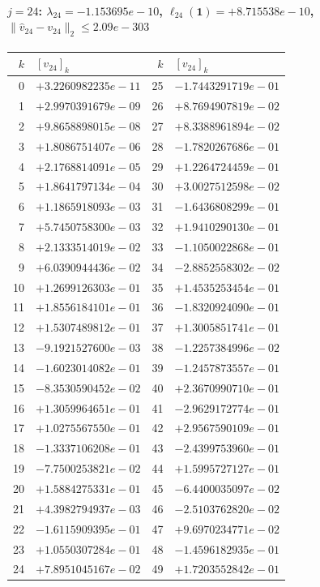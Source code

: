 \paragraph{$j = 24$: $\lambda_{24} = -1.153695e-10$, \quad $\ell_{24}(\mathbf{1}) = +8.715538e-10$, \quad $\|\hat{v}_{24} - v_{24}\|_2 \leq 2.09e-303$}
\begin{center}
{\footnotesize
\begin{tabular}{r@{\;\;}l@{\quad}r@{\;\;}l}
\toprule
$k$ & $[v_{24}]_k$ & $k$ & $[v_{24}]_k$ \\
\midrule
0 & $+3.2260982235e-11$ & 25 & $-1.7443291719e-01$ \\
1 & $+2.9970391679e-09$ & 26 & $+8.7694907819e-02$ \\
2 & $+9.8658898015e-08$ & 27 & $+8.3388961894e-02$ \\
3 & $+1.8086751407e-06$ & 28 & $-1.7820267686e-01$ \\
4 & $+2.1768814091e-05$ & 29 & $+1.2264724459e-01$ \\
5 & $+1.8641797134e-04$ & 30 & $+3.0027512598e-02$ \\
6 & $+1.1865918093e-03$ & 31 & $-1.6436808299e-01$ \\
7 & $+5.7450758300e-03$ & 32 & $+1.9410290130e-01$ \\
8 & $+2.1333514019e-02$ & 33 & $-1.1050022868e-01$ \\
9 & $+6.0390944436e-02$ & 34 & $-2.8852558302e-02$ \\
10 & $+1.2699126303e-01$ & 35 & $+1.4535253454e-01$ \\
11 & $+1.8556184101e-01$ & 36 & $-1.8320924090e-01$ \\
12 & $+1.5307489812e-01$ & 37 & $+1.3005851741e-01$ \\
13 & $-9.1921527600e-03$ & 38 & $-1.2257384996e-02$ \\
14 & $-1.6023014082e-01$ & 39 & $-1.2457873557e-01$ \\
15 & $-8.3530590452e-02$ & 40 & $+2.3670990710e-01$ \\
16 & $+1.3059964651e-01$ & 41 & $-2.9629172774e-01$ \\
17 & $+1.0275567550e-01$ & 42 & $+2.9567590109e-01$ \\
18 & $-1.3337106208e-01$ & 43 & $-2.4399753960e-01$ \\
19 & $-7.7500253821e-02$ & 44 & $+1.5995727127e-01$ \\
20 & $+1.5884275331e-01$ & 45 & $-6.4400035097e-02$ \\
21 & $+4.3982794937e-03$ & 46 & $-2.5103762820e-02$ \\
22 & $-1.6115909395e-01$ & 47 & $+9.6970234771e-02$ \\
23 & $+1.0550307284e-01$ & 48 & $-1.4596182935e-01$ \\
24 & $+7.8951045167e-02$ & 49 & $+1.7203552842e-01$ \\
\bottomrule
\end{tabular}
}
\end{center}

